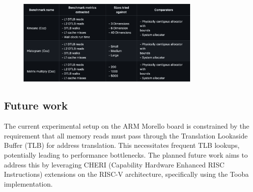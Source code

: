 \documentclass[acmsmall,screen,review]{acmart}
\begin{document}
\begin{figure}[h]
  \includegraphics[width=0.8\textwidth]{diagrams/expirement-runs.png}
\end{figure}




\subsection{Future work}

The current experimental setup on the ARM Morello board is constrained by the requirement that all memory reads must 
pass through the Translation Lookaside Buffer (TLB) for address translation. This necessitates frequent TLB lookups, potentially 
leading to performance bottlenecks. The planned future work aims to address this by leveraging CHERI 
(Capability Hardware Enhanced RISC Instructions) extensions on the RISC-V architecture, specifically using the 
Tooba implementation.
\end{document}
